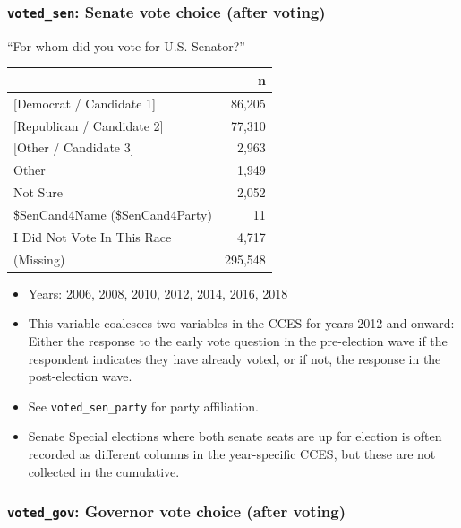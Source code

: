 \documentclass[10pt,article,oneside]{memoir}
\theoremstyle{definition}
\begin{document}
\hypertarget{voted_sen-senate-vote-choice-after-voting}{%
\subsubsection{\texorpdfstring{\texttt{voted\_sen}: Senate vote choice
(after
voting)}{voted\_sen: Senate vote choice (after voting)}}\label{voted_sen-senate-vote-choice-after-voting}}

``For whom did you vote for U.S. Senator?''

\begin{table}[H]
\centering
\begin{tabular}{lr}
\toprule
 & n\\
\midrule
{[Democrat / Candidate 1]} & 86,205\\
{[Republican / Candidate 2]} & 77,310\\
{[Other / Candidate 3]} & 2,963\\
Other & 1,949\\
Not Sure & 2,052\\
\$SenCand4Name (\$SenCand4Party) & 11\\
I Did Not Vote In This Race & 4,717\\
(Missing) & 295,548\\
\bottomrule
\end{tabular}
\end{table}

\begin{itemize}
\tightlist
\item
  Years: 2006, 2008, 2010, 2012, 2014, 2016, 2018
\item
  This variable coalesces two variables in the CCES for years 2012 and
  onward: Either the response to the early vote question in the
  pre-election wave if the respondent indicates they have already voted,
  or if not, the response in the post-election wave.
\item
  See \texttt{voted\_sen\_party} for party affiliation.
\item
  Senate Special elections where both senate seats are up for election
  is often recorded as different columns in the year-specific CCES, but
  these are not collected in the cumulative.
\end{itemize}

\hypertarget{voted_gov-governor-vote-choice-after-voting}{%
\subsubsection{\texorpdfstring{\texttt{voted\_gov}: Governor vote choice
(after
voting)}{voted\_gov: Governor vote choice (after voting)}}\label{voted_gov-governor-vote-choice-after-voting}}
\end{document}
